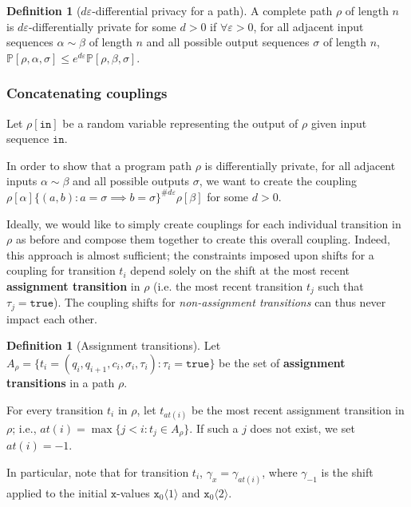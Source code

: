 \documentclass[12pt]{article}
\newcommand{\PP}{\mathbb{P}}
\newcommand{\brangle}[1]{\langle #1 \rangle}
\theoremstyle{definition}
\newtheorem{defn}[thm]{Definition}
\begin{document}
\begin{defn}[$d\varepsilon$-differential privacy for a path]
    A complete path $\rho$ of length $n$ is $d\varepsilon$-differentially private for some $d>0$ if $\forall \varepsilon>0$, for all adjacent input sequences $\alpha\sim \beta$ of length $n$ and all possible output sequences $\sigma$ of length $n$, $\PP[\rho, \alpha, \sigma]\leq e^{d\varepsilon}\PP[\rho, \beta, \sigma]$.
\end{defn}

\subsubsection{Concatenating couplings}

Let $\rho[\texttt{in}]$ be a random variable representing the output of $\rho$ given input sequence $\texttt{in}$. 

In order to show that a program path $\rho$ is differentially private, for all adjacent inputs $\alpha\sim\beta$ and all possible outputs $\sigma$, we want to create the coupling $\rho[\alpha]\{(a, b): a=\sigma\implies b=\sigma\}^{\#d\varepsilon}\rho[\beta]$ for some $d>0$. 

Ideally, we would like to simply create couplings for each individual transition in $\rho$ as before and compose them together to create this overall coupling. Indeed, this approach is almost sufficient; the constraints imposed upon shifts for a coupling for transition $t_i$ depend solely on the shift at the most recent \textbf{assignment transition} in $\rho$ (i.e. the most recent transition $t_j$ such that $\tau_j = \texttt{true}$). 
The coupling shifts for \textit{non-assignment transitions} can thus never impact each other. 

\begin{defn}[Assignment transitions]
    Let $A_\rho = \{t_i=(q_i, q_{i+1}, c_i, \sigma_i, \tau_i): \tau_i = \texttt{true}\}$ be the set of \textbf{assignment transitions} in a path $\rho$. 

    For every transition $t_i$ in $\rho$, let $t_{at(i)}$ be the most recent assignment transition in $\rho$; i.e., $at(i) = \max\{j<i: t_j\in A_\rho\}$. If such a $j$ does not exist, we set $at(i)=-1$. 
\end{defn}

In particular, note that for transition $t_i$, $\gamma_x = \gamma_{at(i)}$, where $\gamma_{-1}$ is the shift applied to the initial $\texttt{x}$-values $\texttt{x}_0\brangle{1}$ and $\texttt{x}_0\brangle{2}$.
\end{document}
